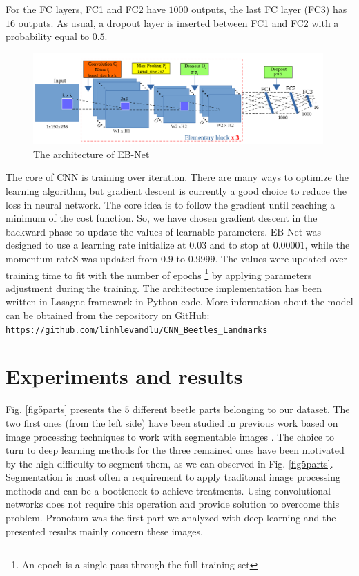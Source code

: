 \documentclass[review]{elsarticle}
\begin{document}
For the FC layers, FC1 and FC2 have $1000$ outputs, the last FC layer (FC3) has $16$ outputs. As usual, a dropout layer is inserted between FC1 and FC2 with a probability equal to $0.5$.

\begin{figure}[h]
	\centering
	\includegraphics[width=0.99\textwidth]{images/model3}
	\caption{The architecture of EB-Net}
	\label{fignet3}
\end{figure}

The core of CNN is training over iteration. There are many ways to
optimize the learning algorithm, but gradient descent
\cite{lecun2012efficient} is currently a good choice to reduce the
loss in neural network. The core idea is to follow the gradient until
reaching a minimum of the cost function. So, we have chosen gradient
descent in the backward phase to update the values of learnable
parameters. EB-Net was designed to use a learning rate initialize at
$0.03$ and to stop at $0.00001$, while the momentum rateS was updated from
$0.9$ to $0.9999$. The values were updated over training time to fit
with the number of epochs \footnote{An epoch is a single pass through
  the full training set} by applying parameters adjustment during the
training. The architecture implementation has been written in Lasagne
framework \cite{lasagne} in Python code. More information about the
model can be obtained from the repository on GitHub:
\texttt{https://github.com/linhlevandlu/CNN\_Beetles\_Landmarks}

\section{Experiments and results}
\label{sexperiments}
Fig. \ref{fig5parts} presents the $5$ different beetle parts belonging
to our dataset. The two first ones (from the left side) have been
studied in previous work based on image processing techniques
to work with segmentable images \cite{le2017maelab}. The choice to
turn to deep learning methods for the three remained ones have
been motivated by the high difficulty to segment them, as we can
observed in Fig. \ref{fig5parts}. Segmentation is most often a
requirement to apply traditonal image processing methods and can be a
bootleneck to achieve treatments. Using convolutional networks does not
require this operation and provide solution to overcome this
problem. Pronotum was the first part we analyzed with deep learning and the presented results mainly concern
these images.
\end{document}
